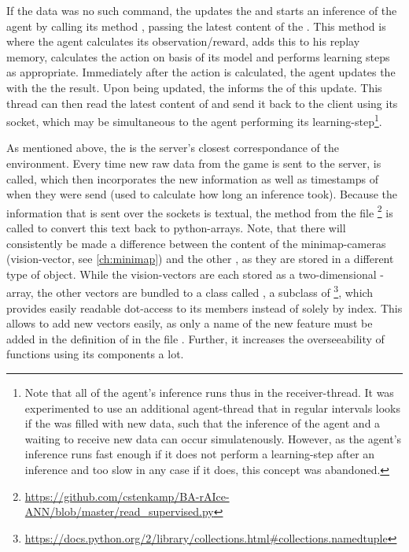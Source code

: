 If the data was no such command, the  updates the  and starts an inference of the agent by calling its method , passing the latest content of the . This method is where the agent calculates its observation/reward, adds this to his replay memory, calculates the action on basis of its model and performs learning steps as appropriate. Immediately after the action is calculated, the agent updates the  with the the result. Upon being updated, the  informs the  of this update. This thread can then read the latest content of  and send it back to the client using its socket, which may be simultaneous to the agent performing its learning-step\footnote{Note that all of the agent's inference runs thus in the receiver-thread. It was experimented to use an additional agent-thread that in regular intervals looks if the  was filled with new data, such that the inference of the agent and a waiting to receive new data can occur simulatenously. However, as the agent's inference runs fast enough if it does not perform a learning-step after an inference and too slow in any case if it does, this concept was abandoned.}. 

As mentioned above, the  is the server's closest correspondance of the environment. Every time new raw data from the game is sent to the server,  is called, which then incorporates the new information as well as timestamps of when they were send (used to calculate how long an inference took). Because the information that is sent over the sockets is textual, the method  from the file \footnote{\url{https://github.com/cstenkamp/BA-rAIce-ANN/blob/master/read_supervised.py}} is called to convert this text back to python-arrays. Note, that there will consistently be made a difference between the content of the minimap-cameras (vision-vector, see \ref{ch:minimap}) and the other , as they are stored in a different type of object. While the vision-vectors are each stored as a two-dimensional -array, the other vectors are bundled to a class called , a subclass of  \footnote{\url{https://docs.python.org/2/library/collections.html#collections.namedtuple}}, which provides easily readable dot-access to its members instead of solely by index. This allows to add new vectors easily, as only a name of the new feature must be added in the definition of  in the file . Further, it increases the overseeability of functions using its components a lot.

